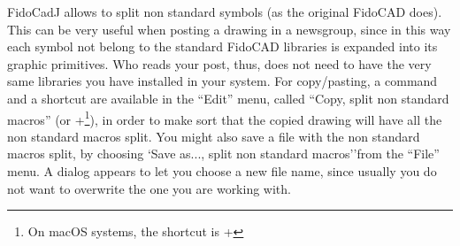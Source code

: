 \documentclass[10pt,a4paper,twoside]{scrreprt}
\newcommand{\keyevidence}[1]{\fbox{#1}}
\begin{document}
FidoCadJ allows to split non standard symbols (as the original FidoCAD does). This can be very useful when posting a drawing in a newsgroup, since in this way each symbol not belong to the standard FidoCAD libraries is expanded into its graphic primitives. Who reads your post, thus, does not need to have the very same libraries you have installed in your system.
For copy/pasting, a command and a shortcut are available in the ``Edit'' menu, called ``Copy, split non standard macros'' (or \keyevidence{Control}+\keyevidence{M}\footnote{On macOS systems, the shortcut is \keyevidence{Command}+\keyevidence{M}}), in order to make sort that the copied drawing will have all the non standard macros split.
You might also save a file with the non standard macros split, by choosing `Save as..., split non standard macros''from the ``File'' menu. A dialog appears to let you choose a new file name, since usually you do not want to overwrite the one you are working with.
\end{document}
